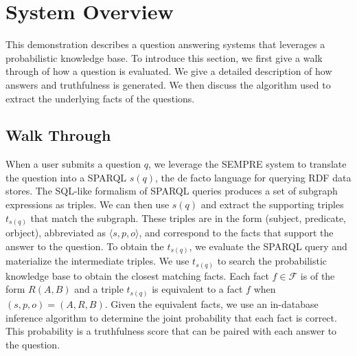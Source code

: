 
\section{System Overview}

This demonstration describes a question answering systems that leverages a probabilistic knowledge base.
To introduce this section, we first give a walk through of how a question is evaluated.
We give a detailed description of how answers and truthfulness is generated.
We then discuss the algorithm used to extract the underlying facts of the questions.




\subsection{Walk Through}
\label{sec:probqa-walkthrough}
When a user submits a question \(q\), we leverage the SEMPRE system to translate
the question into a SPARQL $s(q)$, the de facto language for querying RDF data stores.
The  SQL-like formalism of SPARQL queries produces a set of subgraph expressions as triples.
We can then use $s(q)$ and extract the supporting triples \(t_{s(q)}\) that
match the subgraph.
These triples are in the form (subject, predicate, orbject), abbreviated as
\(\langle s, p, o \rangle\), and correspond to the facts that support the answer to the question.
To obtain the \(t_{s(q)}\), we evaluate the SPARQL query and materialize the
intermediate triples.
We use \(t_{s(q)}\) to search the probabilistic knowledge base to obtain the closest matching facts.
Each fact \(f \in \mathcal{F}\) is of the form \(R(A,B)\) and a triple \(t_{s(q)}\) is equivalent to a fact \(f\) when 
\( (s,p,o) = (A,R,B) \).
Given the equivalent facts, we use an in-database inference algorithm to determine the joint probability that each fact is correct.
This probability is a truthfulness score that can be paired with each answer to the question.



